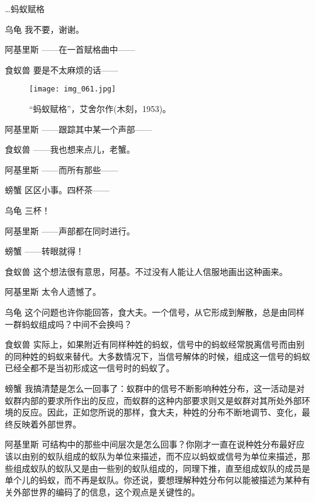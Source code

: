 \begin{dialog}{…蚂蚁赋格}
\begin{dialogue}
\item[乌龟]我不要，谢谢。

\item[阿基里斯]——在一首赋格曲中——

\item[食蚁兽]要是不太麻烦的话——

\begin{figure}
\texttt{[image: img\_061.jpg]}
\caption[“蚂蚁赋格”，艾舍尔作。]
  {“蚂蚁赋格”，艾舍尔作(木刻，1953)。}
\end{figure}

\item[阿基里斯]——跟踪其中某一个声部——

\item[食蚁兽]——我也想来点儿，老蟹。

\item[阿基里斯]——而所有那些——

\item[螃蟹]区区小事。四杯茶——

\item[乌龟]三杯！

\item[阿基里斯]——声部都在同时进行。

\item[螃蟹]——转眼就得！

\item[食蚁兽]这个想法很有意思，阿基。不过没有人能让人信服地画出这种画来。

\item[阿基里斯]太令人遗憾了。

\item[乌龟]这个问题也许你能回答，食大夫。一个信号，从它形成到解散，总是由同样一群蚂蚁组成吗？中间不会换吗？

\item[食蚁兽]实际上，如果附近有同样种姓的蚂蚁，信号中的蚂蚁经常脱离信号而由别的同种姓的蚂蚁来替代。大多数情况下，当信号解体的时候，组成这一信号的蚂蚁已经全都不是当初形成这一信号时的蚂蚁了。

\item[螃蟹]我搞清楚是怎么一回事了：蚁群中的信号不断影响种姓分布，这一活动是对蚁群内部的要求所作出的反应，而蚁群的这种内部要求则又是蚁群对其所处外部环境的反应。因此，正如您所说的那样，食大夫，种姓的分布不断地调节、变化，最终反映着外部世界。

\item[阿基里斯]可结构中的那些中间层次是怎么回事？你刚才一直在说种姓分布最好应该以由别的蚁队组成的蚁队为单位来描述，而不应以蚂蚁或信号为单位来描述，那些组成蚁队的蚁队又是由一些别的蚁队组成的，同理下推，直至组成蚁队的成员是单个儿的蚂蚁，而不再是蚁队。你还说，要想理解种姓分布何以能被描述为某种有关外部世界的编码了的信息，这个观点是关键性的。


\end{dialogue}
\end{dialog}
